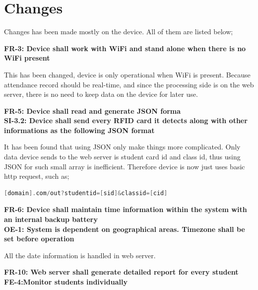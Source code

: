\documentclass{article}
\begin{document}
	

\section{Changes}

Changes has been made mostly on the device. All of them are listed below;

{\setlength{\parindent}{0cm}
\vspace{5mm}
\textbf{FR-3: Device shall work with WiFi and stand alone when there is no WiFi present}
\vspace{5mm}
}

This has been changed, device is only operational when WiFi is present. Because attendance record should be real-time, and since the processing side is on the web server, there is no need to keep data on the device for later use.

{\setlength{\parindent}{0cm}
\vspace{5mm}
\textbf{FR-5: Device shall read and generate JSON forma \\ SI-3.2: Device shall send every RFID card it detects along with other informations as the following JSON format}
\vspace{5mm}
}

It has been found that using JSON only make things more complicated. Only data device sends to the web server is student card id and class id, thus using JSON for such small array is inefficient. Therefore device is now just uses basic http request, such as;

\begin{file}
\begin{lstlisting}[language=C]
[domain].com/out?studentid=[sid]&classid=[cid]
\end{lstlisting}
\end{file}

{\setlength{\parindent}{0cm}
\vspace{5mm}
\textbf{FR-6: Device shall maintain time information within the system with an internal backup battery \\ OE-1: System is dependent on geographical areas. Timezone shall be set before operation}
\vspace{5mm}
}

All the date information is handled in web server.

{\setlength{\parindent}{0cm}
\vspace{5mm}
\textbf{FR-10: Web server shall generate detailed report for every student \\ FE-4:Monitor students individually}
\vspace{5mm}
}
\end{document}
